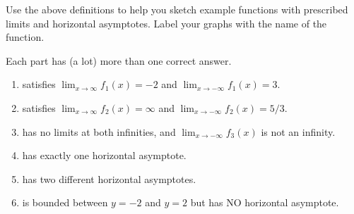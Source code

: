 \documentclass[../main.tex]{subfiles}
\begin{document}
\begin{example}
  Use the above definitions to help you sketch example functions with prescribed limits and horizontal asymptotes. Label your graphs with the name of the function. 

  Each part has (a lot) more than one correct answer. 

  \begin{enumerate}[label=\(f_{\arabic*}\)]
    \item satisfies \(\lim_{x \to \infty} f_{1}(x) = -2\) and \(\lim_{x \to -\infty} f_{1}(x) = 3\).
    \item satisfies \(\lim_{x \to \infty} f_{2}(x) = \infty\) and \(\lim_{x \to -\infty} f_{2}(x) = 5/3\).
      \begin{center}
        
        \qquad
        
      \end{center}

    \item has no limits at both infinities, and \(\lim_{x \to -\infty} f_{3}(x)\) is not an infinity. 
    \item has exactly one horizontal asymptote.

      \begin{center}
        
        \qquad
        
      \end{center}

    \item has two different horizontal asymptotes.
    \item is bounded between \(y = -2\) and \(y = 2\) but has NO horizontal asymptote.

      \begin{center}
        
        \qquad
        
      \end{center}
  \end{enumerate}

\end{example}
\clearpage
\end{document}
